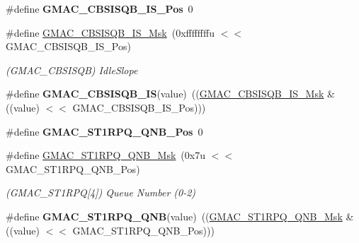 \begin{DoxyCompactItemize}
\#define {\bfseries G\+M\+A\+C\+\_\+\+C\+B\+S\+I\+S\+Q\+B\+\_\+\+I\+S\+\_\+\+Pos}~0
\item 
\mbox{\label{group__SAME70__GMAC_gae23af9b2e081f22e3575d37ee39ee8f5}} 
\#define \mbox{\hyperlink{group__SAME70__GMAC_gae23af9b2e081f22e3575d37ee39ee8f5}{G\+M\+A\+C\+\_\+\+C\+B\+S\+I\+S\+Q\+B\+\_\+\+I\+S\+\_\+\+Msk}}~(0xffffffffu $<$$<$ G\+M\+A\+C\+\_\+\+C\+B\+S\+I\+S\+Q\+B\+\_\+\+I\+S\+\_\+\+Pos)
\begin{DoxyCompactList}\small\item\em (G\+M\+A\+C\+\_\+\+C\+B\+S\+I\+S\+QB) Idle\+Slope \end{DoxyCompactList}\item 
\mbox{\label{group__SAME70__GMAC_ga3c070c2312a484c1ea416e37a2bc455e}} 
\#define {\bfseries G\+M\+A\+C\+\_\+\+C\+B\+S\+I\+S\+Q\+B\+\_\+\+IS}(value)~((\mbox{\hyperlink{group__SAMV71__GMAC_gae23af9b2e081f22e3575d37ee39ee8f5}{G\+M\+A\+C\+\_\+\+C\+B\+S\+I\+S\+Q\+B\+\_\+\+I\+S\+\_\+\+Msk}} \& ((value) $<$$<$ G\+M\+A\+C\+\_\+\+C\+B\+S\+I\+S\+Q\+B\+\_\+\+I\+S\+\_\+\+Pos)))
\item 
\mbox{\label{group__SAME70__GMAC_ga76a416147fff5f230a24862a07407bcc}} 
\#define {\bfseries G\+M\+A\+C\+\_\+\+S\+T1\+R\+P\+Q\+\_\+\+Q\+N\+B\+\_\+\+Pos}~0
\item 
\mbox{\label{group__SAME70__GMAC_ga116b03c1235186e0c4bc6215fe077a49}} 
\#define \mbox{\hyperlink{group__SAME70__GMAC_ga116b03c1235186e0c4bc6215fe077a49}{G\+M\+A\+C\+\_\+\+S\+T1\+R\+P\+Q\+\_\+\+Q\+N\+B\+\_\+\+Msk}}~(0x7u $<$$<$ G\+M\+A\+C\+\_\+\+S\+T1\+R\+P\+Q\+\_\+\+Q\+N\+B\+\_\+\+Pos)
\begin{DoxyCompactList}\small\item\em (G\+M\+A\+C\+\_\+\+S\+T1\+R\+PQ\mbox{[}4\mbox{]}) Queue Number (0-\/2) \end{DoxyCompactList}\item 
\mbox{\label{group__SAME70__GMAC_ga231735742f1f414ff9980e1f527af7a9}} 
\#define {\bfseries G\+M\+A\+C\+\_\+\+S\+T1\+R\+P\+Q\+\_\+\+Q\+NB}(value)~((\mbox{\hyperlink{group__SAMV71__GMAC_ga116b03c1235186e0c4bc6215fe077a49}{G\+M\+A\+C\+\_\+\+S\+T1\+R\+P\+Q\+\_\+\+Q\+N\+B\+\_\+\+Msk}} \& ((value) $<$$<$ G\+M\+A\+C\+\_\+\+S\+T1\+R\+P\+Q\+\_\+\+Q\+N\+B\+\_\+\+Pos)))

\end{DoxyCompactItemize}
